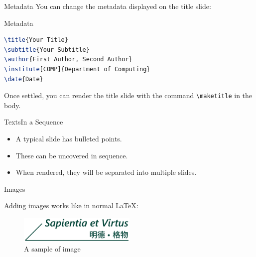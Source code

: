 \documentclass[10pt,aspectratio=169]{beamer}
\begin{document}
\begin{frame}[fragile]{Metadata}
	You can change the metadata displayed on the title slide:

\begin{block}{Metadata}
\begin{lstlisting}[language=TeX]
\title{Your Title}
\subtitle{Your Subtitle}
\author{First Author, Second Author}
\institute[COMP]{Department of Computing}
\date{Date}
\end{lstlisting}
\end{block}

	Once settled, you can render the title slide with the command \verb|\maketitle| in the body.
\end{frame}

\begin{frame}[fragile]{Texts}{In a Sequence}

	\begin{itemize}[<+->]
		\item A typical slide has bulleted points.
		\item These can be uncovered in sequence.
		\item When rendered, they will be separated into multiple slides.
	\end{itemize}

\end{frame}

\begin{frame}{Images}

	Adding images works like in normal \LaTeX:
	
	\begin{figure}[hbt]
		\includegraphics[width=0.5\textwidth]{source/tagline}
 		\caption{A sample of image}
	\end{figure}
	
\end{frame}
\end{document}
